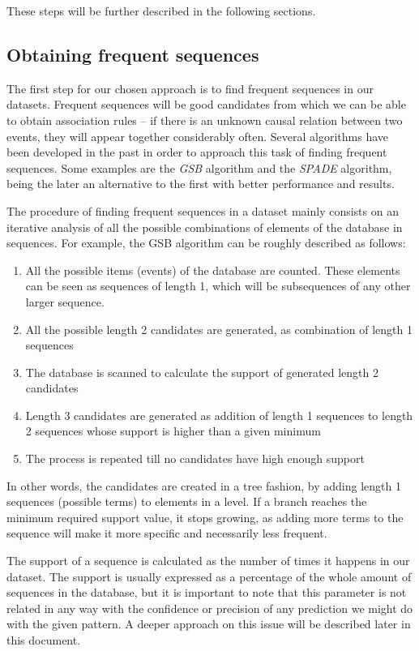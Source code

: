 \documentclass[a4paper,12pt]{article}
\begin{document}
These steps will be further described in the following sections.

\subsection{Obtaining frequent sequences}
\label{sec:mining_sequences}
The first step for our chosen approach is to find frequent sequences in our datasets. Frequent sequences will be good candidates from which we can be able to obtain association rules -- if there is an unknown causal relation between two events, they will appear together considerably often. Several algorithms have been developed in the past in order to approach this task of finding frequent sequences. Some examples are the \emph{GSB}\cite{zaki2001spade} algorithm and the \emph{SPADE}\cite{zaki2001spade} algorithm, being the later an alternative to the first with better performance and results.

The procedure of finding frequent sequences in a dataset mainly consists on an iterative analysis of all the possible combinations of elements of the database in sequences. For example, the GSB algorithm can be roughly described as follows:

\begin{enumerate}
\item All the possible items (events) of the database are counted. These elements can be seen as sequences of length 1, which will be subsequences of any other larger sequence.
\item All the possible length 2 candidates are generated, as combination of length 1 sequences
\item The database is scanned to calculate the support of generated length 2 candidates
\item Length 3 candidates are generated as addition of length 1 sequences to length 2 sequences whose support is higher than a given minimum
\item The process is repeated till no candidates have high enough support
\end{enumerate}

In other words, the candidates are created in a tree fashion, by adding length 1 sequences (possible terms) to elements in a level. If a branch reaches the minimum required support value, it stops growing, as adding more terms to the sequence will make it more specific and necessarily less frequent.

The support of a sequence is calculated as the number of times it happens in our dataset. The support is usually expressed as a percentage of the whole amount of sequences in the database, but it is important to note that this parameter is not related in any way with the confidence or precision of any prediction we might do with the given pattern. A deeper approach on this issue will be described later in this document.
\end{document}
